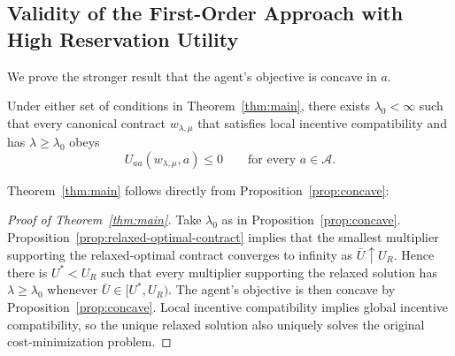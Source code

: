 \subsection{Validity of the First-Order Approach with High Reservation Utility}

We prove the
stronger result that the agent's objective is concave in $a$.

\begin{proposition}
\label{prop:concave}
Under either set of conditions in Theorem~\ref{thm:main}, there exists
$\lambda_0<\infty$ such that every canonical contract $w_{\lambda,\mu}$ that
satisfies local incentive compatibility and has $\lambda\geq\lambda_0$ obeys
\[
    U_{aa}(w_{\lambda,\mu},a)\leq0
    \qquad\text{for every }a\in\mathcal A.
\]
\end{proposition}

Theorem~\ref{thm:main} follows directly from Proposition~\ref{prop:concave}:

\begin{proof}[Proof of Theorem~\ref{thm:main}]
Take $\lambda_0$ as in Proposition~\ref{prop:concave}.  Proposition~\ref{prop:relaxed-optimal-contract} implies that the smallest multiplier
supporting the relaxed-optimal contract converges to infinity as
$\bar U\uparrow U_R$.  Hence there is $U^*<U_R$ such that every multiplier
supporting the relaxed solution has $\lambda\geq\lambda_0$ whenever
$\bar U\in[U^*,U_R)$.  The agent's objective is then concave by Proposition~\ref{prop:concave}.  Local incentive compatibility implies global incentive compatibility, so the unique
relaxed solution also uniquely solves the original cost-minimization problem.
\end{proof}


